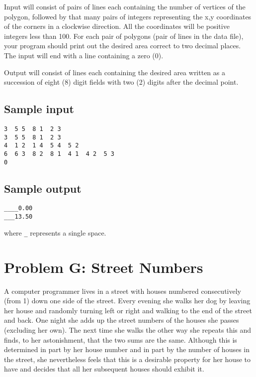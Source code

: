 Input will consist of pairs of lines each containing the number of
vertices of the polygon, followed by that many pairs of integers
representing the x,y coordinates of the corners in a clockwise
direction. All the coordinates will be positive integers less than 100.
For each pair of polygons (pair of lines in the data file), your
program should print out the desired area correct to two decimal places.
The input will end with a line containing a zero (0).

Output will consist of lines each containing the desired area written
as a succession of eight (8) digit fields with two (2) digits after the 
decimal point.

\subsection*{Sample input}

\begin{verbatim}
3  5 5  8 1  2 3
3  5 5  8 1  2 3
4  1 2  1 4  5 4  5 2
6  6 3  8 2  8 1  4 1  4 2  5 3
0
\end{verbatim}

\subsection*{Sample output}

\begin{verbatim}
____0.00
___13.50
\end{verbatim}

where \verb|_| represents a single space.

\newpage

\section*{Problem G: Street Numbers}

A computer programmer lives in a street with houses numbered
consecutively (from 1) down one side of the street.  Every evening she walks
her dog by leaving her house and randomly turning left or right and
walking to the end of the street and back.  One night she adds up the street
numbers of the houses she passes (excluding her own).  The next time she
walks the other way she repeats this and finds, to her astonishment,
that the two sums are the same.  Although this is determined in part
by her house number and in part by the number of houses in the street,
she nevertheless feels that this is a desirable property for her house to
have and decides that all her subsequent houses should exhibit it.

